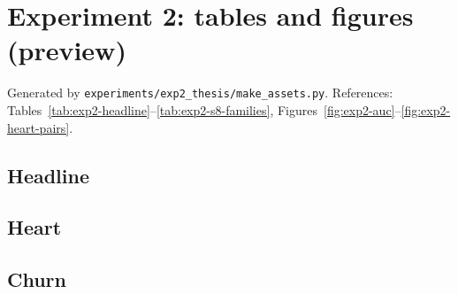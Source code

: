 \documentclass[a4paper,12pt,openany]{book}
\begin{document}
\chapter*{Experiment 2: tables and figures (preview)}
Generated by \texttt{experiments/exp2\_thesis/make\_assets.py}. References:
Tables~\ref{tab:exp2-headline}--\ref{tab:exp2-s8-families}, Figures~\ref{fig:exp2-auc}--\ref{fig:exp2-heart-pairs}.

\section*{Headline}



\clearpage
\section*{Heart}








\clearpage
\section*{Churn}








\end{document}
